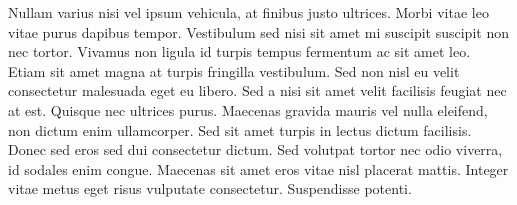 Nullam varius nisi vel ipsum vehicula, at finibus justo ultrices. Morbi vitae leo vitae purus dapibus tempor. Vestibulum sed nisi sit amet mi suscipit suscipit non nec tortor. Vivamus non ligula id turpis tempus fermentum ac sit amet leo. Etiam sit amet magna at turpis fringilla vestibulum. Sed non nisl eu velit consectetur malesuada eget eu libero. Sed a nisi sit amet velit facilisis feugiat nec at est. Quisque nec ultrices purus. Maecenas gravida mauris vel nulla eleifend, non dictum enim ullamcorper. Sed sit amet turpis in lectus dictum facilisis. Donec sed eros sed dui consectetur dictum. Sed volutpat tortor nec odio viverra, id sodales enim congue. Maecenas sit amet eros vitae nisl placerat mattis. Integer vitae metus eget risus vulputate consectetur. Suspendisse potenti.
